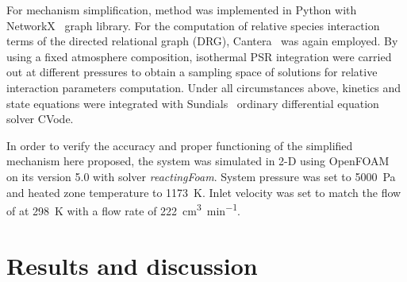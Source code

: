 \documentclass[final,3p,times,twocolumn,sort&compress]{elsarticle}
\begin{document}
\begin{table}[h]
	\caption{\label{tab-acetylene-inlet-composition}Inlet acetylene gas composition given in mole fractions adopted for simulations. Nitrogen carrier is assumed free of impurities and its proportion in the mixture is identical to the experimental conditions.}
	
\end{table}

For mechanism simplification, \citet{Lu2005} method was implemented in Python with NetworkX~\cite{Networkx2016} graph library. For the computation of relative species interaction terms of the directed relational graph (DRG), Cantera~\cite{Cantera2014} was again employed. By using a fixed atmosphere composition, isothermal PSR integration were carried out at different pressures to obtain a sampling space of solutions for relative interaction parameters computation. Under all circumstances above, kinetics and state equations were integrated with Sundials~\cite{Hindmarsh2005} ordinary differential equation solver CVode.

In order to verify the accuracy and proper functioning of the simplified mechanism here proposed, the system was simulated in 2-D using OpenFOAM~\cite{Weller1998} on its version 5.0 with solver \emph{reactingFoam}. System pressure was set to \SI{5000}{\pascal} and heated zone temperature to \SI{1173}{\kelvin}. Inlet velocity was set to match the flow of  at \SI{298}{\kelvin} with a flow rate of \SI{222}{\cubic\centi\metre\per\minute}.

\section{Results and discussion}
\end{document}
